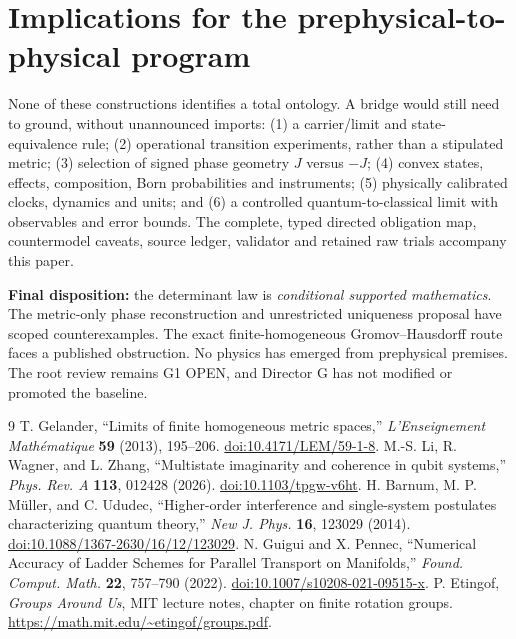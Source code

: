 \documentclass[10pt,letterpaper]{article}
\theoremstyle{plain}\newtheorem{theorem}{Theorem}\newtheorem{proposition}{Proposition}
\theoremstyle{definition}\newtheorem{remark}{Remark}
\begin{document}
\clearpage
\section{Implications for the prephysical-to-physical program}
None of these constructions identifies a total ontology. A bridge would still need to ground, without unannounced imports: (1) a carrier/limit and state-equivalence rule; (2) operational transition experiments, rather than a stipulated metric; (3) selection of signed phase geometry $J$ versus $-J$; (4) convex states, effects, composition, Born probabilities and instruments; (5) physically calibrated clocks, dynamics and units; and (6) a controlled quantum-to-classical limit with observables and error bounds. The complete, typed directed obligation map, countermodel caveats, source ledger, validator and retained raw trials accompany this paper.

\textbf{Final disposition:} the determinant law is \emph{conditional supported mathematics}. The metric-only phase reconstruction and unrestricted uniqueness proposal have scoped counterexamples. The exact finite-homogeneous Gromov--Hausdorff route faces a published obstruction. No physics has emerged from prephysical premises. The root review remains G1 OPEN, and Director G has not modified or promoted the baseline.

\begin{thebibliography}{9}\small
{} T. Gelander, ``Limits of finite homogeneous metric spaces,'' \emph{L'Enseignement Math\'ematique} \textbf{59} (2013), 195--206. \href{https://doi.org/10.4171/LEM/59-1-8}{doi:10.4171/LEM/59-1-8}.
 M.-S. Li, R. Wagner, and L. Zhang, ``Multistate imaginarity and coherence in qubit systems,'' \emph{Phys. Rev. A} \textbf{113}, 012428 (2026). \href{https://doi.org/10.1103/tpgw-v6ht}{doi:10.1103/tpgw-v6ht}.
 H. Barnum, M. P. M\"uller, and C. Ududec, ``Higher-order interference and single-system postulates characterizing quantum theory,'' \emph{New J. Phys.} \textbf{16}, 123029 (2014). \href{https://doi.org/10.1088/1367-2630/16/12/123029}{doi:10.1088/1367-2630/16/12/123029}.
 N. Guigui and X. Pennec, ``Numerical Accuracy of Ladder Schemes for Parallel Transport on Manifolds,'' \emph{Found. Comput. Math.} \textbf{22}, 757--790 (2022). \href{https://doi.org/10.1007/s10208-021-09515-x}{doi:10.1007/s10208-021-09515-x}.
 P. Etingof, \emph{Groups Around Us}, MIT lecture notes, chapter on finite rotation groups. \url{https://math.mit.edu/~etingof/groups.pdf}.
\end{thebibliography}
\end{document}

